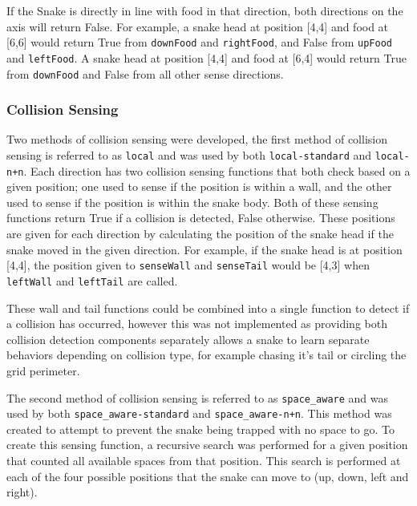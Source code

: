 If the Snake is directly in line with food in that direction, both directions on the axis will return False. For example, a snake head at position [4,4] and food at [6,6] would return True from \verb|downFood| and \verb|rightFood|, and False from \verb|upFood| and \verb|leftFood|. A snake head at position [4,4] and food at [6,4] would return True from \verb|downFood| and False from all other sense directions.

\subsubsection{Collision Sensing}
Two methods of collision sensing were developed, the first method of collision sensing is referred to as \verb|local| and was used by both \verb|local-standard| and \verb|local-n+n|. Each direction has two collision sensing functions that both check based on a given position; one used to sense if the position is within a wall, and the other used to sense if the position is within the snake body. Both of these sensing functions return True if a collision is detected, False otherwise. These positions are given for each direction by calculating the position of the snake head if the snake moved in the given direction. For example, if the snake head is at position [4,4], the position given to \verb|senseWall| and \verb|senseTail| would be [4,3] when \verb|leftWall| and \verb|leftTail| are called. 

These wall and tail functions could be combined into a single function to detect if a collision has occurred, however this was not implemented as providing both collision detection components separately allows a snake to learn separate behaviors depending on collision type, for example chasing it's tail or circling the grid perimeter.

The second method of collision sensing is referred to as \verb|space_aware| and was used by both \verb|space_aware-standard| and \verb|space_aware-n+n|. This method was created to attempt to prevent the snake being trapped with no space to go. To create this sensing function, a recursive search was performed for a given position that counted all available spaces from that position. This search is performed at each of the four possible positions that the snake can move to (up, down, left and right).
